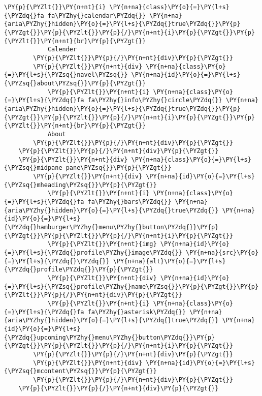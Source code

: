 \begin{Verbatim}[commandchars=\\\{\}]
            \PY{p}{\PYZlt{}}\PY{n+nt}{i} \PY{n+na}{class}\PY{o}{=}\PY{l+s}{\PYZdq{}fa fa\PYZhy{}calendar\PYZdq{}} \PY{n+na}{aria\PYZhy{}hidden}\PY{o}{=}\PY{l+s}{\PYZdq{}true\PYZdq{}}\PY{p}{\PYZgt{}}\PY{p}{\PYZlt{}}\PY{p}{/}\PY{n+nt}{i}\PY{p}{\PYZgt{}}\PY{p}{\PYZlt{}}\PY{n+nt}{br}\PY{p}{\PYZgt{}}
            Calender
        \PY{p}{\PYZlt{}}\PY{p}{/}\PY{n+nt}{div}\PY{p}{\PYZgt{}}
        \PY{p}{\PYZlt{}}\PY{n+nt}{div} \PY{n+na}{class}\PY{o}{=}\PY{l+s}{\PYZsq{}navel\PYZsq{}} \PY{n+na}{id}\PY{o}{=}\PY{l+s}{\PYZsq{}about\PYZsq{}}\PY{p}{\PYZgt{}}
            \PY{p}{\PYZlt{}}\PY{n+nt}{i} \PY{n+na}{class}\PY{o}{=}\PY{l+s}{\PYZdq{}fa fa\PYZhy{}info\PYZhy{}circle\PYZdq{}} \PY{n+na}{aria\PYZhy{}hidden}\PY{o}{=}\PY{l+s}{\PYZdq{}true\PYZdq{}}\PY{p}{\PYZgt{}}\PY{p}{\PYZlt{}}\PY{p}{/}\PY{n+nt}{i}\PY{p}{\PYZgt{}}\PY{p}{\PYZlt{}}\PY{n+nt}{br}\PY{p}{\PYZgt{}}
            About
        \PY{p}{\PYZlt{}}\PY{p}{/}\PY{n+nt}{div}\PY{p}{\PYZgt{}}
    \PY{p}{\PYZlt{}}\PY{p}{/}\PY{n+nt}{div}\PY{p}{\PYZgt{}}
    \PY{p}{\PYZlt{}}\PY{n+nt}{div} \PY{n+na}{class}\PY{o}{=}\PY{l+s}{\PYZsq{}midpane pane\PYZsq{}}\PY{p}{\PYZgt{}}
        \PY{p}{\PYZlt{}}\PY{n+nt}{div} \PY{n+na}{id}\PY{o}{=}\PY{l+s}{\PYZsq{}mheading\PYZsq{}}\PY{p}{\PYZgt{}}
            \PY{p}{\PYZlt{}}\PY{n+nt}{i} \PY{n+na}{class}\PY{o}{=}\PY{l+s}{\PYZdq{}fa fa\PYZhy{}bars\PYZdq{}} \PY{n+na}{aria\PYZhy{}hidden}\PY{o}{=}\PY{l+s}{\PYZdq{}true\PYZdq{}} \PY{n+na}{id}\PY{o}{=}\PY{l+s}{\PYZdq{}hamburger\PYZhy{}menu\PYZhy{}button\PYZdq{}}\PY{p}{\PYZgt{}}\PY{p}{\PYZlt{}}\PY{p}{/}\PY{n+nt}{i}\PY{p}{\PYZgt{}}
            \PY{p}{\PYZlt{}}\PY{n+nt}{img} \PY{n+na}{id}\PY{o}{=}\PY{l+s}{\PYZdq{}profile\PYZhy{}image\PYZdq{}} \PY{n+na}{src}\PY{o}{=}\PY{l+s}{\PYZdq{}\PYZdq{}} \PY{n+na}{alt}\PY{o}{=}\PY{l+s}{\PYZdq{}profile\PYZdq{}}\PY{p}{\PYZgt{}}
            \PY{p}{\PYZlt{}}\PY{n+nt}{div} \PY{n+na}{id}\PY{o}{=}\PY{l+s}{\PYZsq{}profile\PYZhy{}name\PYZsq{}}\PY{p}{\PYZgt{}}\PY{p}{\PYZlt{}}\PY{p}{/}\PY{n+nt}{div}\PY{p}{\PYZgt{}}
            \PY{p}{\PYZlt{}}\PY{n+nt}{i} \PY{n+na}{class}\PY{o}{=}\PY{l+s}{\PYZdq{}fa fa\PYZhy{}asterisk\PYZdq{}} \PY{n+na}{aria\PYZhy{}hidden}\PY{o}{=}\PY{l+s}{\PYZdq{}true\PYZdq{}} \PY{n+na}{id}\PY{o}{=}\PY{l+s}{\PYZdq{}upcoming\PYZhy{}menu\PYZhy{}button\PYZdq{}}\PY{p}{\PYZgt{}}\PY{p}{\PYZlt{}}\PY{p}{/}\PY{n+nt}{i}\PY{p}{\PYZgt{}}
        \PY{p}{\PYZlt{}}\PY{p}{/}\PY{n+nt}{div}\PY{p}{\PYZgt{}}
        \PY{p}{\PYZlt{}}\PY{n+nt}{div} \PY{n+na}{id}\PY{o}{=}\PY{l+s}{\PYZsq{}mcontent\PYZsq{}}\PY{p}{\PYZgt{}}
        \PY{p}{\PYZlt{}}\PY{p}{/}\PY{n+nt}{div}\PY{p}{\PYZgt{}}
    \PY{p}{\PYZlt{}}\PY{p}{/}\PY{n+nt}{div}\PY{p}{\PYZgt{}}

\end{Verbatim}
